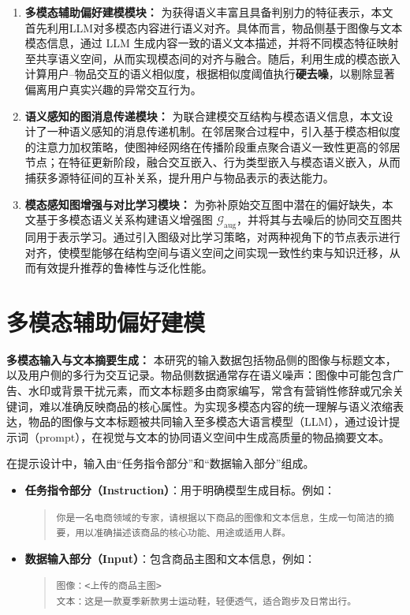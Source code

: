 \begin{enumerate}
    \item \textbf{多模态辅助偏好建模模块：} 为获得语义丰富且具备判别力的特征表示，本文首先利用LLM对多模态内容进行语义对齐。具体而言，物品侧基于图像与文本模态信息，通过 LLM 生成内容一致的语义文本描述，并将不同模态特征映射至共享语义空间，从而实现模态间的对齐与融合。随后，利用生成的模态嵌入计算用户–物品交互的语义相似度，根据相似度阈值执行\textbf{硬去噪}，以剔除显著偏离用户真实兴趣的异常交互行为。
    
    \item \textbf{语义感知的图消息传递模块：} 为联合建模交互结构与模态语义信息，本文设计了一种语义感知的消息传递机制。在邻居聚合过程中，引入基于模态相似度的注意力加权策略，使图神经网络在传播阶段重点聚合语义一致性更高的邻居节点；在特征更新阶段，融合交互嵌入、行为类型嵌入与模态语义嵌入，从而捕获多源特征间的互补关系，提升用户与物品表示的表达能力。
    
    \item \textbf{模态感知图增强与对比学习模块：} 为弥补原始交互图中潜在的偏好缺失，本文基于多模态语义关系构建语义增强图 $\mathcal{G}_{\text{aug}}$，并将其与去噪后的协同交互图共同用于表示学习。通过引入图级对比学习策略，对两种视角下的节点表示进行对齐，使模型能够在结构空间与语义空间之间实现一致性约束与知识迁移，从而有效提升推荐的鲁棒性与泛化性能。
\end{enumerate}


\section{多模态辅助偏好建模}
\textbf{多模态输入与文本摘要生成：}  
本研究的输入数据包括物品侧的图像与标题文本，以及用户侧的多行为交互记录。物品侧数据通常存在语义噪声：图像中可能包含广告、水印或背景干扰元素，而文本标题多由商家编写，常含有营销性修辞或冗余关键词，难以准确反映商品的核心属性。为实现多模态内容的统一理解与语义浓缩表达，物品的图像与文本标题被共同输入至多模态大语言模型（LLM），通过设计提示词（prompt），在视觉与文本的协同语义空间中生成高质量的物品摘要文本。

在提示设计中，输入由“任务指令部分”和“数据输入部分”组成。  
\begin{itemize}
    \item \textbf{任务指令部分（Instruction）}：用于明确模型生成目标。例如：
    \begin{quote}
        \texttt{你是一名电商领域的专家，请根据以下商品的图像和文本信息，生成一句简洁的摘要，用以准确描述该商品的核心功能、用途或适用人群。}
    \end{quote}

    \item \textbf{数据输入部分（Input）}：包含商品主图和文本信息，例如：
    \begin{quote}
        \texttt{图像：<上传的商品主图>}\\
        \texttt{文本：这是一款夏季新款男士运动鞋，轻便透气，适合跑步及日常出行。}
    \end{quote}
\end{itemize}

